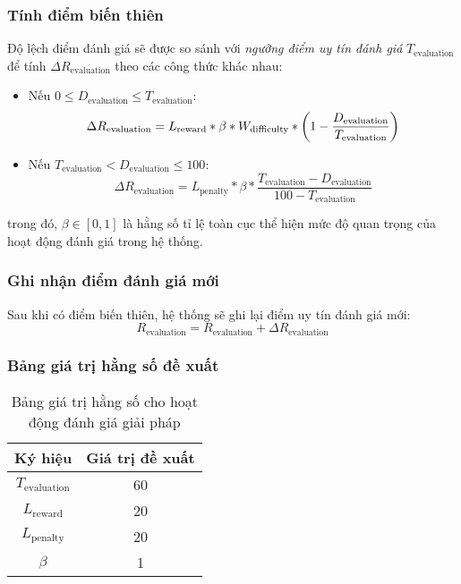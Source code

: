 \subsubsection{Tính điểm biến thiên}

Độ lệch điểm đánh giá sẽ được so sánh với \textit{ngưỡng điểm uy tín đánh giá} $T_{\text{evaluation}}$ để tính $\Delta R_{\text{evaluation}}$ theo các công thức khác nhau:

\begin{itemize}
  \item Nếu $0 \leq D_{\text{evaluation}} \leq  T_{\text{evaluation}}$:
        \[\Delta R_{\text{\text{evaluation}}} = L_{\text{reward}}*\beta*W_{\text{difficulty}} * \left(1 - \frac{D_{\text{evaluation}}}{T_{\text{evaluation}}}\right) \]
  \item Nếu $T_{\text{evaluation}} < D_{\text{evaluation}} \leq 100$:
        \[\Delta R_{{\text{evaluation}}} = L_{\text{penalty}}*\beta * \frac{T_{\text{evaluation}} - D_{\text{evaluation}}}{100-T_{\text{evaluation}}} \]
\end{itemize}
trong đó, $\beta \in [0, 1]$ là hằng số tỉ lệ toàn cục thể hiện mức độ quan trọng của hoạt động đánh giá trong hệ thống.

\subsubsection{Ghi nhận điểm đánh giá mới}

Sau khi có điểm biến thiên, hệ thống sẽ ghi lại điểm uy tín đánh giá mới:
\[R_{\text{evaluation}} = R_{\text{evaluation}} + \Delta R_{\text{evaluation}}\]

\subsubsection{Bảng giá trị hằng số đề xuất}

\begin{table}[H]
  \centering
  \small
  \begin{tabular}{|c|c|}
    \hline
    \textbf{Ký hiệu}        & \textbf{Giá trị đề xuất} \\ \hline
    $T_{\text{evaluation}}$ & 60                       \\ \hline
    $L_{\text{reward}}$     & 20                       \\ \hline
    $L_{\text{penalty}}$    & 20                       \\ \hline
    $\beta$                 & 1                        \\ \hline
  \end{tabular}
  \caption{Bảng giá trị hằng số cho hoạt động đánh giá giải pháp}
  \label{tab:suggested-constant-values-for-evaluation}
\end{table}

